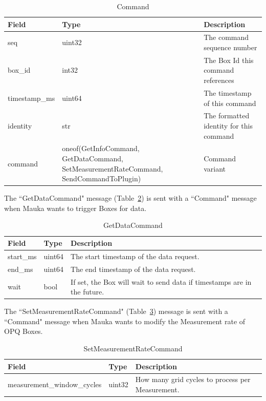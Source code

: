 \begin{table}[H]
	\centering
	\caption{Command}
	\begin{tabularx}{\textwidth}{lXX}
		\toprule
		\textbf{Field} & \textbf{Type} & \textbf{Description} \\
		\midrule
		seq & uint32 & The command sequence number \\
		box\_id & int32 & The Box Id this command references \\
		timestamp\_ms & uint64 & The timestamp of this command \\
		identity & str & The formatted identity for this command \\
		command & oneof(GetInfoCommand, GetDataCommand, SetMeasurementRateCommand, SendCommandToPlugin) & Command variant \\
		\bottomrule
	\end{tabularx}
	\label{table:Command}
\end{table}

The ``GetDataCommand" message (Table~\ref{table:GetDataCommand}) is sent with a ``Command" message when Mauka wants to trigger Boxes for data.

\begin{table}[H]
    \centering
    \caption{GetDataCommand}
    \begin{tabularx}{\textwidth}{llX}
        \toprule
        \textbf{Field} & \textbf{Type} & \textbf{Description} \\
        \midrule
        start\_ms & uint64 & The start timestamp of the data request. \\
        end\_ms & uint64 & The end timestamp of the data request. \\
        wait & bool & If set, the Box will wait to send data if timestamps are in the future. \\
        \bottomrule
    \end{tabularx}
    \label{table:GetDataCommand}
\end{table}

The ``SetMeasurementRateCommand" (Table~\ref{table:SetMeasurementRateCommand}) message is sent with a ``Command" message when Mauka wants to modify the Measurement rate of OPQ Boxes.

\begin{table}[H]
	\centering
	\caption{SetMeasurementRateCommand}
	\begin{tabularx}{\textwidth}{llX}
		\toprule
		\textbf{Field} & \textbf{Type} & \textbf{Description} \\
		\midrule
		measurement\_window\_cycles & uint32 & How many grid cycles to process per Measurement. \\
		\bottomrule
	\end{tabularx}
	\label{table:SetMeasurementRateCommand}
\end{table}

